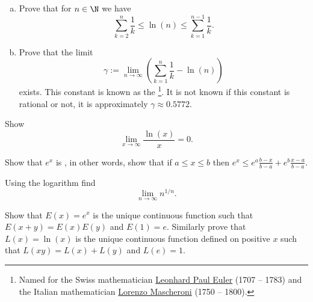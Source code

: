 \documentclass[12pt]{book}
\begin{document}
\begin{exercise}
\begin{enumerate}[a)]
 \item Prove that for $n \in \N$ we have
\begin{equation*}
\sum_{k=2}^{n}
\frac{1}{k}
\leq
\ln (n)
\leq
\sum_{k=1}^{n-1}
\frac{1}{k} .
\end{equation*}
  \item Prove that the limit
\begin{equation*}
\gamma := \lim_{n\to\infty}
\left( \sum_{k=1}^{n}
\frac{1}{k} - \ln (n) \right)
\end{equation*}
exists.
This constant is known as the
\emph{}%
\footnote{Named for the Swiss mathematician
\href{http://en.wikipedia.org/wiki/Leonhard_Euler}{Leonhard Paul Euler} (1707 -- 1783)
and the Italian mathematician
\href{http://en.wikipedia.org/wiki/Lorenzo_Mascheroni}{Lorenzo Mascheroni}
(1750 -- 1800).}.
It is not known if this constant is rational or not,
it is approximately $\gamma \approx 0.5772$.
\end{enumerate}
\end{exercise}

\begin{exercise}
Show
\begin{equation*}
\lim_{x\to\infty} \frac{\ln(x)}{x} = 0 .
\end{equation*}
\end{exercise}

\begin{exercise}
Show that $e^x$ is \emph{}, in other words, show that 
if $a \leq x \leq b$ then
$e^x \leq e^a \frac{b-x}{b-a} + e^b \frac{x-a}{b-a}$.
\end{exercise}

\begin{exercise}
Using the logarithm find
\begin{equation*}
\lim_{n\to\infty} n^{1/n} .
\end{equation*}
\end{exercise}

\begin{exercise}
Show that $E(x) = e^x$ is the unique continuous function such that
$E(x+y) = E(x)E(y)$ and $E(1) = e$.
 Similarly prove that $L(x) = \ln(x)$
is the unique continuous
function defined on positive $x$ such that $L(xy) = L(x)+L(y)$
and $L(e) = 1$.
\end{exercise}
\end{document}
